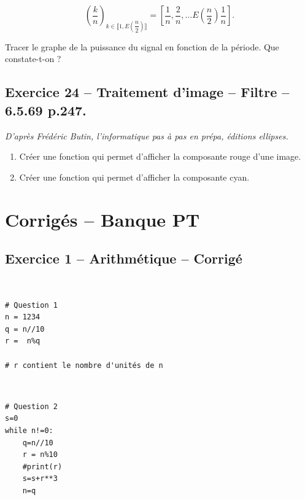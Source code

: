 \documentclass[10pt,fleqn]{article} %
\begin{document}
\begin{multicols}{2}
\begin{enumerate}
$$
\left( \dfrac{k}{n} \right)_{k\in \llbracket 1, E\left(\dfrac{n}{2}\right) \rrbracket} = \left[ \dfrac{1}{n},\dfrac{2}{n},\ldots E\left(\dfrac{n}{2}\right) \dfrac{1}{n}\right].
$$

Tracer le graphe de la puissance du signal en fonction de la période. Que constate-t-on ?
\end{enumerate}

\subsection*{Exercice 24 -- Traitement d'image -- Filtre -- 6.5.69 p.247.}
\begin{flushright}
\textit{D'après Frédéric Butin, l'informatique pas à pas en prépa, éditions ellipses.}
\end{flushright}

\begin{enumerate}
\item Créer une fonction qui permet d'afficher la composante rouge d'une image. 
\item Créer une fonction qui permet d'afficher la composante cyan.
\end{enumerate}

\end{multicols}



\newpage 

\section{Corrigés -- Banque PT}
\subsection*{Exercice 1 -- Arithmétique -- Corrigé}

\begin{corrige}
$\quad$
\begin{lstlisting}
# Question 1
n = 1234
q = n//10
r =  n%q

# r contient le nombre d'unités de n
\end{lstlisting}
\end{corrige}

\begin{corrige}
$\quad$
\begin{lstlisting}
# Question 2
s=0
while n!=0:
    q=n//10
    r = n%10
    #print(r)
    s=s+r**3
    n=q
\end{lstlisting}
\end{corrige}
\end{document}
